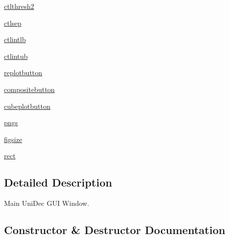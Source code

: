 \begin{DoxyCompactItemize}
\item 
\hyperlink{class_uni_dec_1_1unidec__modules_1_1mainwindow_1_1_mainwindow_a0b0ef0a740961586a163e375f22489ae}{ctlthresh2}
\item 
\hyperlink{class_uni_dec_1_1unidec__modules_1_1mainwindow_1_1_mainwindow_ae973927c82f3832b20c401221f33594c}{ctlsep}
\item 
\hyperlink{class_uni_dec_1_1unidec__modules_1_1mainwindow_1_1_mainwindow_af6fbad5be4326582001522ce5d9dce51}{ctlintlb}
\item 
\hyperlink{class_uni_dec_1_1unidec__modules_1_1mainwindow_1_1_mainwindow_ac1f02ef874f18d30c3b607950e647705}{ctlintub}
\item 
\hyperlink{class_uni_dec_1_1unidec__modules_1_1mainwindow_1_1_mainwindow_a2d100921c4947eebf33998cdb3e265e9}{replotbutton}
\item 
\hyperlink{class_uni_dec_1_1unidec__modules_1_1mainwindow_1_1_mainwindow_ad0ca6a2d400d56c321dc29b84a198086}{compositebutton}
\item 
\hyperlink{class_uni_dec_1_1unidec__modules_1_1mainwindow_1_1_mainwindow_af2207b39a28913d594d6da3c639baa8b}{cubeplotbutton}
\item 
\hyperlink{class_uni_dec_1_1unidec__modules_1_1mainwindow_1_1_mainwindow_a4ba73ba6ee2c0d4d9e5ab7026fac36e9}{pngs}
\item 
\hyperlink{class_uni_dec_1_1unidec__modules_1_1mainwindow_1_1_mainwindow_a945ef7ae6600f8f39f2c149b52839a64}{figsize}
\item 
\hyperlink{class_uni_dec_1_1unidec__modules_1_1mainwindow_1_1_mainwindow_a7def26005399043bf5a81350e3f348a7}{rect}
\end{DoxyCompactItemize}


\subsection{Detailed Description}
\begin{DoxyVerb}Main UniDec GUI Window.
\end{DoxyVerb}
 

\subsection{Constructor \& Destructor Documentation}
\hypertarget{class_uni_dec_1_1unidec__modules_1_1mainwindow_1_1_mainwindow_ab854ca6e4c994de7f2ef52256112cd64}{}
